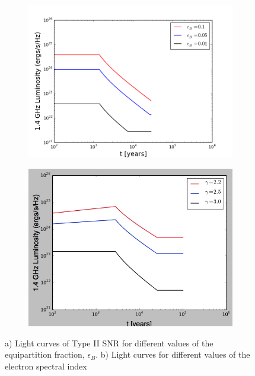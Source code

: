 \documentclass[10pt,a4paper]{article}
\begin{document}
\begin{figure}[h!]
	\begin{subfigure}[b]{1.5\textwidth}
		\includegraphics[width=12cm]{epsb.png}
		\caption{}
	\end{subfigure}
	\begin{subfigure}[b]{1.5\textwidth}
		\includegraphics[width=12cm]{spectralindex.png}
		\caption{}
	\end{subfigure}
	\caption{a) Light curves of Type II SNR for different values of the equipartition fraction, $\epsilon_B$. b) Light curves for different values of the electron spectral index}
\end{figure}
\newpage
\end{document}
